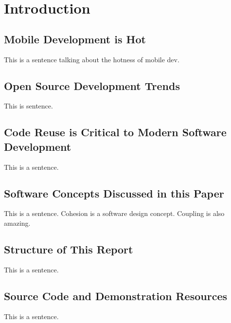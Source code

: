 \chapter{Introduction}
%
\label{ch:intro}

%
%

\section{Mobile Development is Hot}
This is a sentence talking about the hotness of mobile dev.

\section{Open Source Development Trends}
This is sentence.

\section{Code Reuse is Critical to Modern Software Development}
This is a sentence.

\section{Software Concepts Discussed in this Paper}
This is a sentence.
Cohesion is a software design concept.
Coupling is also amazing.

\section{Structure of This Report}
This is a sentence.

\section{Source Code and Demonstration Resources}
This is a sentence.

